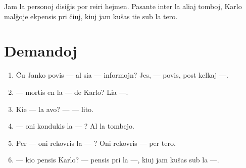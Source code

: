 Jam la personoj disiĝis por reiri hejmen. Pasante inter la aliaj tomboj, Karlo malĝoje ekpensis pri ĉiuj, kiuj jam kuŝas tie sub la tero.

\newpage

\section*{Demandoj}

\begin{enumerate}
    \item  Ĉu Janko povis — al sia — informojn? Jes, — povis, post kelkaj —.
    \item  — mortis en la — de Karlo? Lia —.
    \item  Kie — la avo? — — lito.
    \item  — oni kondukis la — ? Al la tombejo.
    \item  Per — oni rekovris la — ? Oni rekovris — per tero.
    \item  — kio pensis Karlo? — pensis pri la —, kiuj jam kuŝas sub la —.
\end{enumerate}
